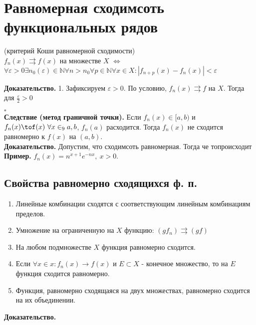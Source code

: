 \section{Равномерная сходимсоть функциональных рядов}
\begin{theor}
    (критерий Коши равномерной сходимости)\\
    $f_n(x)\rightrightarrows f(x)$ на множестве  $X$  $\Leftrightarrow$ 
    $\forall \varepsilon>0\exists n_0(\varepsilon)\in\mathbb{N}\forall n>n_0
    \forall p\in\mathbb{N} \forall x\in X: |f_{n+p}(x)-f_n(x)|<\varepsilon$

\end{theor}
\textbf{Доказательство.} 1. Зафиксируем $\varepsilon>0$. По условию,
$f_n(x)\rightrightarrows f$ на $X$. Тогда для  $\frac{\varepsilon}{2}>0$ 



$\square$ \\
\textbf{Следствие (метод граничной точки).} Если $f_n(x)\in[a,b)$ и 
$f_n(x)\tof(x)~\forall x\in_9a,b$, $f_n(a)$ расходится. Тогда  $f_n(x)$
не сходится равномерно к  $f(x)$ на  $(a,b)$.\\
\textbf{Доказательство.} Допустим, что сходимсоть равномерная. Тогда 
че топроисходит\\
\textbf{Пример.} $f_n(x)=n^{x+1}e^{-nx},~x>0$.\\
\subsection{Свойства равномерно сходящихся ф. п.}
\begin{enumerate}
    \item Линейные комбинации сходятся с соответствующим линейным комбинациям
        пределов. 
    \item Умножение на ограниченную на $X$ функцию:  $(gf_n)\rightrightarrows
        (gf)$
    \item На любом подмножестве $X$ функция равномерно сходится. 
    \item Если  $\forall x\in x: f_n(x)\to f(x)$ и $E\subset X$ - конечное 
        множество, то на $E$ функция сходится равномерно.
    \item Функция, равномерно сходящаяся на двух множествах, равномерно
        сходится на их объединении.
\end{enumerate}
\textbf{Доказательство.} 


